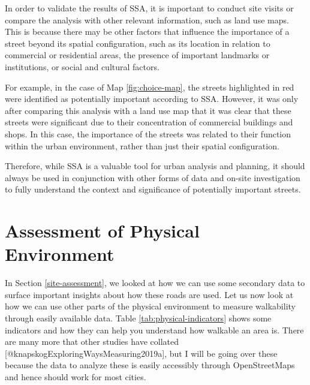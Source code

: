 \documentclass[
]{latex/krantz}
\begin{document}
In order to validate the results of SSA, it is important to conduct site visits or compare the analysis with other relevant information, such as land use maps. This is because there may be other factors that influence the importance of a street beyond its spatial configuration, such as its location in relation to commercial or residential areas, the presence of important landmarks or institutions, or social and cultural factors.

For example, in the case of Map \ref{fig:choice-map}, the streets highlighted in red were identified as potentially important according to SSA. However, it was only after comparing this analysis with a land use map that it was clear that these streets were significant due to their concentration of commercial buildings and shops. In this case, the importance of the streets was related to their function within the urban environment, rather than just their spatial configuration.

Therefore, while SSA is a valuable tool for urban analysis and planning, it should always be used in conjunction with other forms of data and on-site investigation to fully understand the context and significance of potentially important streets.

\hypertarget{physical-environment}{%
\section{Assessment of Physical Environment}\label{physical-environment}}

In Section \ref{site-assessment}, we looked at how we can use some secondary data to surface important insights about how these roads are used. Let us now look at how we can use other parts of the physical environment to measure walkability through easily available data. Table \ref{tab:physical-indicators} shows some indicators and how they can help you understand how walkable an area is. There are many more that other studies have collated {[}@knapskogExploringWaysMeasuring2019a{]}, but I will be going over these because the data to analyze these is easily accessibly through OpenStreetMaps and hence should work for most cities.

\renewcommand{\arraystretch}{2}
\end{document}
